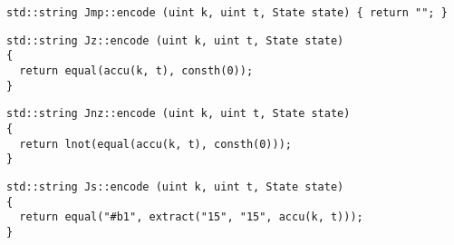 
\begin{lstlisting}[style=c++, style=encode]
std::string Jmp::encode (uint k, uint t, State state) { return ""; }
\end{lstlisting}


\begin{lstlisting}[style=c++, style=encode]
std::string Jz::encode (uint k, uint t, State state)
{
  return equal(accu(k, t), consth(0));
}
\end{lstlisting}


\begin{lstlisting}[style=c++, style=encode]
std::string Jnz::encode (uint k, uint t, State state)
{
  return lnot(equal(accu(k, t), consth(0)));
}
\end{lstlisting}


\begin{lstlisting}[style=c++, style=encode]
std::string Js::encode (uint k, uint t, State state)
{
  return equal("#b1", extract("15", "15", accu(k, t)));
}
\end{lstlisting}


